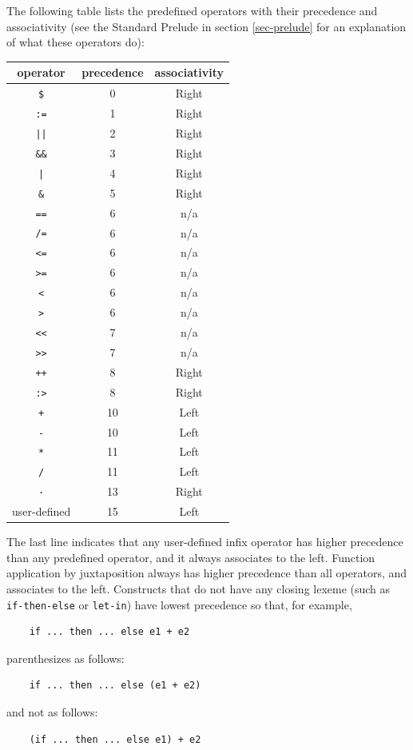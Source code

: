 \documentclass[twoside,letterpaper]{article}
\newcommand{\te}[1]{\texttt{#1}}
\newcommand{\term}[1]{{\tt{#1}}}
\begin{document}
The following table lists the predefined operators with their
precedence and associativity (see the Standard Prelude in section
{\ref{sec-prelude}} for an explanation of what these operators do):
\begin{center}
  \begin{tabular}[t]{|c|c|c|}
    \hline
    operator     & precedence & associativity \\
    \hline
    \term{\$}    & 0  & Right \\
    \verb":="    & 1  & Right \\
    \verb"||"    & 2  & Right \\
    \verb"&&"    & 3  & Right \\
    \verb"|"     & 4  & Right \\
    \verb"&"     & 5  & Right \\
    \verb"=="    & 6  & n/a   \\
    \verb"/="    & 6  & n/a   \\
    \verb"<="    & 6  & n/a   \\
    \verb">="    & 6  & n/a   \\
    \verb"<"     & 6  & n/a   \\
    \verb">"     & 6  & n/a   \\
    \verb"<<"    & 7  & n/a   \\
    \verb">>"    & 7  & n/a   \\
    \verb"++"    & 8  & Right \\
    \verb":>"    & 8  & Right \\
    \verb"+"     & 10  & Left  \\
    \verb"-"     & 10  & Left  \\
    \verb"*"     & 11  & Left  \\
    \verb"/"     & 11  & Left  \\
    \verb"·"     & 13  & Right \\
    user-defined & 15  & Left \\
    \hline
  \end{tabular}
\end{center}
The last line indicates that any user-defined infix operator has
higher precedence than any predefined operator, and it always
associates to the left.  Function application by juxtaposition always
has higher precedence than all operators, and associates to the left.
Constructs that do not have any closing lexeme (such as
{\te{if-then-else}} or {\te{let-in}}) have lowest precedence so that,
for example,
\begin{verbatim}
    if ... then ... else e1 + e2
\end{verbatim}
parenthesizes as follows:
\begin{verbatim}
    if ... then ... else (e1 + e2)
\end{verbatim}
and not as follows:
\begin{verbatim}
    (if ... then ... else e1) + e2
\end{verbatim}
\end{document}
